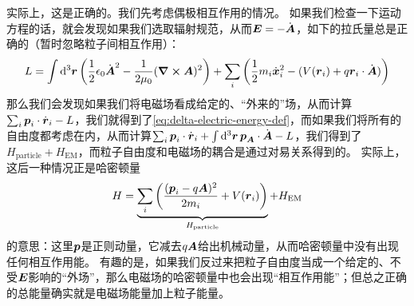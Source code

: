 实际上，这是正确的。我们先考虑偶极相互作用的情况。
如果我们检查一下运动方程的话，就会发现如果我们选取辐射规范，从而$\vb*{E} = - \dot{\vb*{A}}$，如下的拉氏量总是正确的（暂时忽略粒子间相互作用）：
\begin{equation}
    L = \int \dd[3]{\vb*{r}} \left(
        \frac{1}{2} \epsilon_0 \dot{\vb*{A}}^2 
        - \frac{1}{2 \mu_0} (\curl{\vb*{A}})^2 
    \right)
    + \sum_{i} \left(
        \frac{1}{2} m_i \dot{\vb*{x}}_i^2 - (V(\vb*{r}_i) + q \vb*{r}_i \cdot \dot{\vb*{A}})
    \right)
\end{equation}
那么我们会发现如果我们将电磁场看成给定的、“外来的”场，从而计算$\sum_i \vb*{p}_i \cdot \dot{\vb*{r}}_i - L$，我们就得到了\eqref{eq:delta-electric-energy-def}，而如果我们将所有的自由度都考虑在内，从而计算$\sum_i \vb*{p}_i \cdot \dot{\vb*{r}}_i + \int \dd[3]{\vb*{r}} \vb*{p}_{\vb*{A}} \cdot \dot{\vb*{A}} - L$，我们得到了$H_{\text{particle}} + H_{\text{EM}}$，而粒子自由度和电磁场的耦合是通过对易关系得到的。
实际上，这后一种情况正是哈密顿量
\begin{equation}
    H = \underbrace{
        \sum_{i} \left(
        \frac{(\vb*{p}_i - q \vb*{A})^2}{2 m_i} + V(\vb*{r}_i)
        \right)
    }_{H_{\text{particle}}} + H_{\text{EM}}
\end{equation}
的意思：这里$\vb*{p}$是正则动量，它减去$q \vb*{A}$给出机械动量，从而哈密顿量中没有出现任何相互作用能。
有趣的是，如果我们反过来把粒子自由度当成一个给定的、不受$\vb*{E}$影响的“外场”，那么电磁场的哈密顿量中也会出现“相互作用能”；但总之正确的总能量确实就是电磁场能量加上粒子能量。

